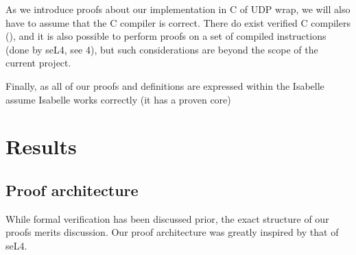 \documentclass[twoside]{memoir}
\begin{document}
As we introduce proofs about our implementation in C of UDP wrap,
we will also have to assume that the C compiler is correct.
There do exist verified C compilers (\cite{compcert}),
and it is also possible to perform proofs on a set of compiled instructions
(done by seL4, see \cite{Klein2014Verification}{4}),
but such considerations are beyond the scope of the current project.

Finally, as all of our proofs and definitions are expressed within the Isabelle 
assume Isabelle works correctly (it has a proven core)

\chapter{Results}
\section{Proof architecture}
While formal verification has been discussed prior,
the exact structure of our proofs merits discussion.
Our proof architecture was greatly inspired by that of seL4.
\end{document}
